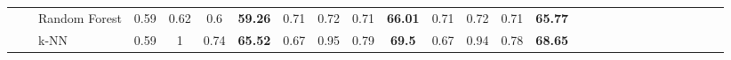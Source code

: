 \documentclass[sn-mathphys]{sn-jnl}%
\theoremstyle{thmstyleone}%
\theoremstyle{thmstyletwo}%
\theoremstyle{thmstylethree}%
\begin{document}
\begin{table*}[hbt!]
{\begin{tabular}{lllcccccccccccccccccccccccc}
\multicolumn{1}{|l|}{}                                  & \multicolumn{1}{l|}{}                                                                                        & \multicolumn{1}{l|}{Random Forest}                        & \multicolumn{1}{c|}{0.59}               & \multicolumn{1}{c|}{0.62}            & \multicolumn{1}{c|}{0.6}               & \multicolumn{1}{c|}{\textbf{59.26}}                                                   & \multicolumn{1}{c|}{0.71}               & \multicolumn{1}{c|}{0.72}            & \multicolumn{1}{c|}{0.71}              & \multicolumn{1}{c|}{\textbf{66.01}}                                                   & \multicolumn{1}{c|}{0.71}               & \multicolumn{1}{c|}{0.72}            & \multicolumn{1}{c|}{0.71}              & \multicolumn{1}{c|}{\textbf{65.77}}                                                   &                      &                      &                      &                      &                      &                      &                      &                      &                      &                      &                      &                      \\ \cline{3-15}
\multicolumn{1}{|l|}{}                                  & \multicolumn{1}{l|}{}                                                                                        & \multicolumn{1}{l|}{k-NN}                                 & \multicolumn{1}{c|}{0.59}               & \multicolumn{1}{c|}{1}               & \multicolumn{1}{c|}{0.74}              & \multicolumn{1}{c|}{\textbf{65.52}}                                                   & \multicolumn{1}{c|}{0.67}               & \multicolumn{1}{c|}{0.95}            & \multicolumn{1}{c|}{0.79}              & \multicolumn{1}{c|}{\textbf{69.5}}                                                    & \multicolumn{1}{c|}{0.67}               & \multicolumn{1}{c|}{0.94}            & \multicolumn{1}{c|}{0.78}              & \multicolumn{1}{c|}{\textbf{68.65}}                                                   &                      &                      &                      &                      &                      &                      &                      &                      &                      &                      &                      &                      \\ \cline{1-15}

\end{tabular}}
\end{table*}
\end{document}
